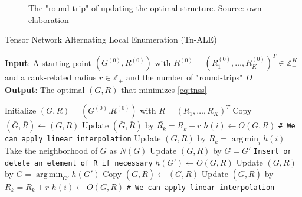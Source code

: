 \documentclass[11pt,a4paper,openright,oneside]{book}
\numberwithin{equation}{section}
\newcommand{\refeq}[1]{\cref{#1}}
\DeclareMathOperator*{\argmin}{arg\,min}
\begin{document}
{\begin{figure}[H]
    \centering
{}
\caption{The "round-trip" of updating the optimal structure. Source: own elaboration}
\end{figure}


\begin{algorithm}[h]
    \caption{Tensor Network Alternating Local Enumeration (Tn-ALE)}

    \hspace*{\algorithmicindent} \textbf{Input}: A starting point $(G^{(0)}, R^{(0)})$ with $R^{(0)} = (R_1^{(0)}, \dots, R_K^{(0)})^T \in \mathbb{Z}_+^K$ 
    and a rank-related radius $r \in \mathbb{Z}_+$ and the number of "round-trips" $D$ \\ 
    \hspace*{\algorithmicindent} \textbf{Output}: The optimal $(G, R)$ that minimizes \refeq{eq:tnss}

    \begin{algorithmic}[1]
        \State Initialize $(G, R) = (G^{(0)}. R^{(0)})$ with $R = (R_1, \dots, R_K)^T$
                    \State Copy $(\bar{G}, \bar{R}) \leftarrow (G, R)$
                    \State Update $(\bar{G}, \bar{R})$ by $\bar{R_k} = R_k + r$
                    \State $h(i) \leftarrow O(G, R)$ \qquad \verb/# We can apply linear interpolation/
                \EndFor
                \State Update $(G, R)$ by $R_k = \argmin_i h(i)$
            \EndFor
            \State Take the neighborhood of $G$ as $N(G)$
                \State Update $(G, R)$ by $G = G'$ \quad \verb|Insert or delete an element of R if necessary|
                \State $h(G') \leftarrow O(G, R)$
            \EndFor
            \State Update $(G, R)$ by $G = \argmin_{G'} h(G')$
                    \State Copy $(\bar{G}, \bar{R}) \leftarrow (G, R)$
                    \State Update $(\bar{G}, \bar{R})$ by $\bar{R_k} = R_k + r$
                    \State $h(i) \leftarrow O(G, R)$ \qquad  \verb/# We can apply linear interpolation/


\end{algorithmic}
\end{algorithm}}
\end{document}
